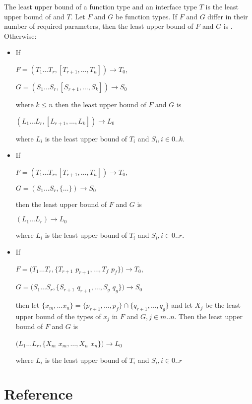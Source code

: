 \documentclass{article}
\begin{document}
\LMHash{}
The least upper bound of a function type and an interface type $T$ is the least upper bound of  and $T$.
Let $F$ and $G$ be function types.
If $F$ and $G$ differ in their number of required parameters, then the least upper bound of $F$ and $G$ is .
Otherwise:
\begin{itemize}
\item If

$F= (T_1 \ldots T_r, [T_{r+1}, \ldots, T_n]) \longrightarrow T_0$,

$G= (S_1 \ldots S_r, [S_{r+1}, \ldots, S_k]) \longrightarrow S_0$

where $k \le n$ then the least upper bound of $F$ and $G$ is

$(L_1 \ldots L_r, [L_{r+1}, \ldots, L_k]) \longrightarrow L_0$

where $L_i$ is the least upper bound of $T_i$ and $S_i, i \in 0 .. k$.
\item If

$F= (T_1 \ldots T_r, [T_{r+1}, \ldots, T_n]) \longrightarrow T_0$,

$G= (S_1 \ldots S_r, \{ \ldots \}) \longrightarrow S_0$

then the least upper bound of $F$ and $G$ is

$(L_1 \ldots L_r) \longrightarrow L_0$

where $L_i$
is the least upper bound of $T_i$ and $S_i, i \in 0 .. r$.
\item If

$F= (T_1 \ldots T_r, \{T_{r+1}$ $p_{r+1}, \ldots, T_f$ $p_f\}) \longrightarrow T_0$,

$G= (S_1 \ldots S_r, \{ S_{r+1}$ $q_{r+1}, \ldots, S_g$ $q_g\}) \longrightarrow S_0$

then let $\{x_m, \ldots x_n\} = \{p_{r+1}, \ldots, p_f\} \cap \{q_{r+1}, \ldots, q_g\}$ and let $X_j$ be the least upper bound of the types of $x_j$ in $F$ and $G, j \in m .. n$.
Then the least upper bound of $F$ and $G$ is

$(L_1 \ldots L_r, \{ X_m$ $x_m, \ldots, X_n$ $x_n\}) \longrightarrow L_0$

where $L_i$ is the least upper bound of $T_i$ and $S_i, i \in 0 .. r$
\end{itemize}


\section{Reference}
\end{document}
